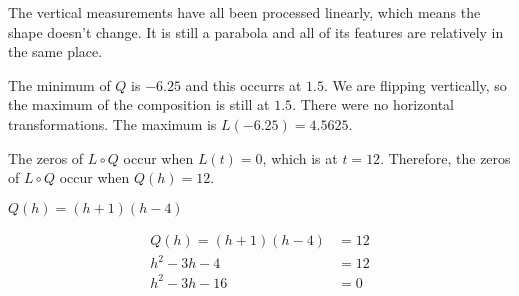 \documentclass{ximera}
\begin{document}
\begin{image}
\end{image}

The vertical measurements have all been processed linearly, which means the shape doesn't change.  It is still a parabola and all of its features are relatively in the same place.



The minimum of $Q$ is $-6.25$ and this occurrs at $1.5$. We are flipping vertically, so the maximum of the composition is still at $1.5$. There were no horizontal transformations.  The maximum is $L(-6.25) = 4.5625$.




The zeros of $L \circ Q$ occur when $L(t) = 0$, which is at $t = 12$.  Therefore, the zeros of $L \circ Q$ occur when $Q(h) = 12$.





$Q(h) = (h+1)(h-4)$



\begin{align*}
Q(h) = (h+1)(h-4)     &  = 12  \\
h^2 - 3h - 4      & = 12   \\
h^2 - 3h - 16 & = 0  \\
\end{align*}
\end{document}
